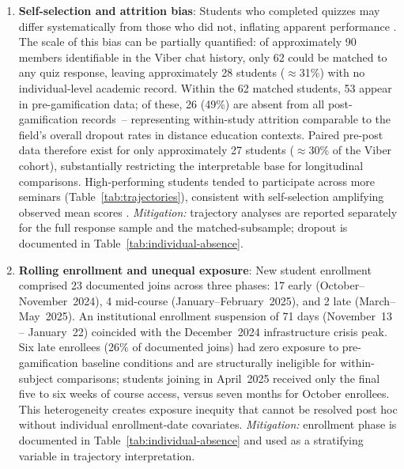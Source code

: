 \begin{enumerate}
\item \textbf{Self-selection and attrition bias}: Students who completed quizzes may differ systematically from those who did not, inflating apparent performance \cite{ary, creswell}. The scale of this bias can be partially quantified: of approximately 90 members identifiable in the Viber chat history, only 62 could be matched to any quiz response, leaving approximately 28 students ($\approx$31\%) with no individual-level academic record. Within the 62 matched students, 53 appear in pre-gamification data; of these, 26 (49\%) are absent from all post-gamification records~-- representing within-study attrition comparable to the field's overall dropout rates in distance education contexts. Paired pre-post data therefore exist for only approximately 27 students ($\approx$30\% of the Viber cohort), substantially restricting the interpretable base for longitudinal comparisons. High-performing students tended to participate across more seminars (Table~\ref{tab:trajectories}), consistent with self-selection amplifying observed mean scores \cite{KoivistoHamari2019}. \textit{Mitigation:} trajectory analyses are reported separately for the full response sample and the matched-subsample; dropout is documented in Table~\ref{tab:individual-absence}.

\item \textbf{Rolling enrollment and unequal exposure}: New student enrollment comprised 23 documented joins across three phases: 17 early (October--November~2024), 4 mid-course (January--February~2025), and 2 late (March--May~2025). An institutional enrollment suspension of 71 days (November~13 -- January~22) coincided with the December~2024 infrastructure crisis peak. Six late enrollees (26\% of documented joins) had zero exposure to pre-gamification baseline conditions and are structurally ineligible for within-subject comparisons; students joining in April~2025 received only the final five to six weeks of course access, versus seven months for October enrollees. This heterogeneity creates exposure inequity that cannot be resolved post hoc without individual enrollment-date covariates. \textit{Mitigation:} enrollment phase is documented in Table~\ref{tab:individual-absence} and used as a stratifying variable in trajectory interpretation.


\end{enumerate}
